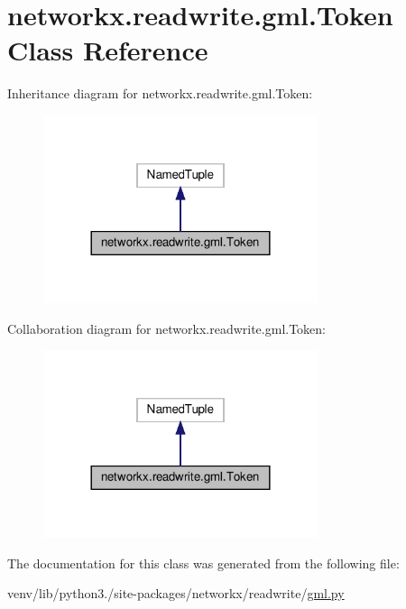 \hypertarget{classnetworkx_1_1readwrite_1_1gml_1_1Token}{}\section{networkx.\+readwrite.\+gml.\+Token Class Reference}
\label{classnetworkx_1_1readwrite_1_1gml_1_1Token}


Inheritance diagram for networkx.\+readwrite.\+gml.\+Token\+:
\nopagebreak
\begin{figure}[H]
\begin{center}
\leavevmode
\includegraphics[width=228pt]{classnetworkx_1_1readwrite_1_1gml_1_1Token__inherit__graph}
\end{center}
\end{figure}


Collaboration diagram for networkx.\+readwrite.\+gml.\+Token\+:
\nopagebreak
\begin{figure}[H]
\begin{center}
\leavevmode
\includegraphics[width=228pt]{classnetworkx_1_1readwrite_1_1gml_1_1Token__coll__graph}
\end{center}
\end{figure}


The documentation for this class was generated from the following file\+:\begin{DoxyCompactItemize}
\item 
venv/lib/python3./site-\/packages/networkx/readwrite/\hyperlink{gml_8py}{gml.\+py}\end{DoxyCompactItemize}
